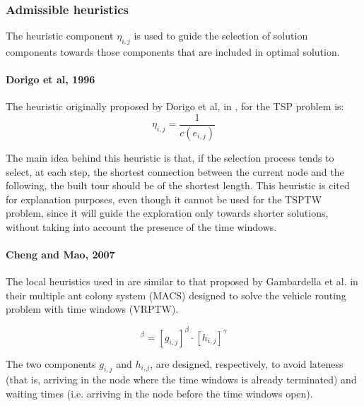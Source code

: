 \begin{homeworkProblem}
\subsubsection{Admissible heuristics}
The heuristic component $\eta_{i,j}$ is used to guide the selection of solution components towards those components that are included in optimal solution.

\paragraph{Dorigo et al, 1996}
The heuristic originally proposed by Dorigo et al, in \cite{dorigo1996ant}, for the TSP problem is:
\begin{equation}
  \eta_{i,j} = \frac{1}{c(e_{i,j})}
\end{equation}

The main idea behind this heuristic is that, if the selection process tends to select, at each step, the shortest connection between the current node and the following, the built tour should be of the shortest length.
This heuristic is cited for explanation purposes, even though it cannot be used for the TSPTW problem, since it will guide the exploration only towards shorter solutions, without taking into account the presence of the time windows.

\paragraph{Cheng and Mao, 2007}
The local heuristics used in \cite{cheng2007modified} are similar to that proposed by Gambardella et al. \cite{gambardella1999macs} in their multiple ant colony system (MACS) designed to solve the vehicle routing problem with time windows (VRPTW).

\begin{equation}
[\eta_{i,j}]^\beta = [g_{i,j}]^\beta \cdot [h_{i,j}]^\gamma
\end{equation}  

The two components $g_{i,j}$ and $h_{i,j}$, are designed, respectively, to avoid lateness (that is, arriving in the node where the time windows is already terminated) and waiting times (i.e. arriving in the node before the time windows open).


\end{homeworkProblem}

